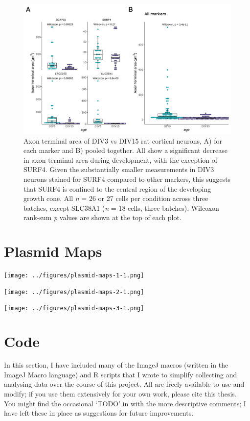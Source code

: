 \documentclass[
  12pt,
  a4paper,
]{book}
\begin{document}
\begin{figure}
\includegraphics{./figures/full/suppl-gc-area-1} \caption[Supplementary figure; axon terminal area in developing cortical neurons]{Axon terminal area of DIV3 vs DIV15 rat cortical neurons, A) for each marker and B) pooled together. All show a significant decrease in axon terminal area during development, with the exception of SURF4. Given the substantially smaller measurements in DIV3 neurons stained for SURF4 compared to other markers, this suggests that SURF4 is confined to the central region of the developing growth cone. All \emph{n} = 26 or 27 cells per condition across three batches, except SLC38A1 (\emph{n} = 18 cells, three batches). Wilcoxon rank-sum \emph{p} values are shown at the top of each plot.}\label{fig:suppl-gc-area}
\end{figure}

\hypertarget{plasmid-maps}{%
\section{Plasmid Maps}\label{plasmid-maps}}

\texttt{[image: ../figures/plasmid-maps-1-1.png]}

\texttt{[image: ../figures/plasmid-maps-2-1.png]}

\texttt{[image: ../figures/plasmid-maps-3-1.png]}

\hypertarget{CODE}{%
\section{Code}\label{CODE}}

In this section, I have included many of the ImageJ macros (written in the ImageJ Macro language) and R scripts that I wrote to simplify collecting and analysing data over the course of this project. All are freely available to use and modify; if you use them extensively for your own work, please cite this thesis. You might find the occasional `TODO' in with the more descriptive comments; I have left these in place as suggestions for future improvements.
\end{document}
